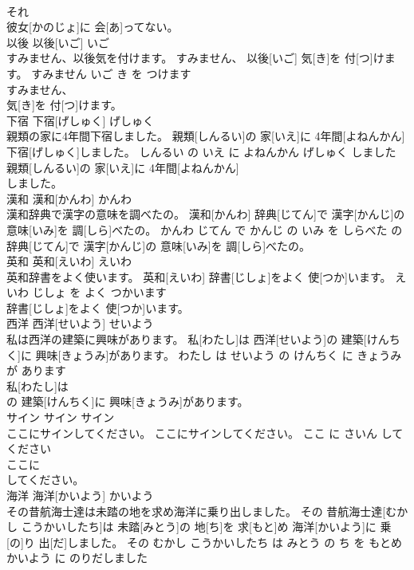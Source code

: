 \documentclass[8pt]{extreport}
\begin{document}
\begin{CJK}{UTF8}{min}
\\	それ
\\	彼女[かのじょ]に 会[あ]ってない。			
\\	以後	以後[いご]	いご	
\\	すみません、以後気を付けます。	すみません、 以後[いご] 気[き]を 付[つ]けます。	すみません いご き を つけます	
\\	すみません、
\\	気[き]を 付[つ]けます。			
\\	下宿	下宿[げしゅく]	げしゅく	
\\	親類の家に4年間下宿しました。	親類[しんるい]の 家[いえ]に 4年間[よねんかん] 下宿[げしゅく]しました。	しんるい の いえ に よねんかん げしゅく しました	
\\	親類[しんるい]の 家[いえ]に 4年間[よねんかん]
\\	しました。			
\\	漢和	漢和[かんわ]	かんわ	
\\	漢和辞典で漢字の意味を調べたの。	漢和[かんわ] 辞典[じてん]で 漢字[かんじ]の 意味[いみ]を 調[しら]べたの。	かんわ じてん で かんじ の いみ を しらべた の	
\\	辞典[じてん]で 漢字[かんじ]の 意味[いみ]を 調[しら]べたの。			
\\	英和	英和[えいわ]	えいわ	
\\	英和辞書をよく使います。	英和[えいわ] 辞書[じしょ]をよく 使[つか]います。	えいわ じしょ を よく つかいます	
\\	辞書[じしょ]をよく 使[つか]います。			
\\	西洋	西洋[せいよう]	せいよう	
\\	私は西洋の建築に興味があります。	私[わたし]は 西洋[せいよう]の 建築[けんちく]に 興味[きょうみ]があります。	わたし は せいよう の けんちく に きょうみ が あります	
\\	私[わたし]は
\\	の 建築[けんちく]に 興味[きょうみ]があります。			
\\	サイン	サイン	サイン	
\\	ここにサインしてください。	ここにサインしてください。	ここ に さいん して ください	
\\	ここに
\\	してください。			
\\	海洋	海洋[かいよう]	かいよう	
\\	その昔航海士達は未踏の地を求め海洋に乗り出しました。	その 昔航海士達[むかし こうかいしたち]は 未踏[みとう]の 地[ち]を 求[もと]め 海洋[かいよう]に 乗[の]り 出[だ]しました。	その むかし こうかいしたち は みとう の ち を もとめ かいよう に のりだしました	

\end{CJK}
\end{document}
